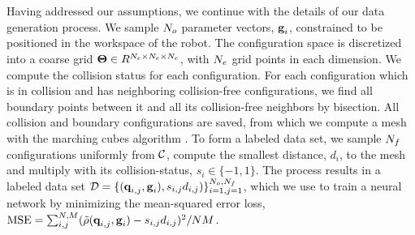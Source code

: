 \documentclass[../main.tex]{subfiles}
\begin{document}
\\\\
Having addressed our assumptions, we continue with the details of our data generation process. We sample $N_{o}$ parameter vectors, $\textbf{g}_i$, constrained to be positioned in the workspace of the robot. The configuration space is discretized into a coarse grid $\bm{\Theta} \in R^{N_{e} \times N_{e} \times N_{e}}$, with $N_{e}$ grid points in each dimension. We compute the collision status for each configuration. For each configuration which is in collision and has neighboring collision-free configurations, we find all boundary points between it and all its collision-free neighbors by bisection. All collision and boundary configurations are saved, from which we compute a mesh with the marching cubes algorithm \citep{marchingcubes}. To form a labeled data set, we sample $N_{f}$ configurations uniformly from $\mathcal{C}$, compute the smallest distance, $d_i$, to the mesh and multiply with its collision-status, $s_i \in \{-1, 1 \}$. The process results in a labeled data set $\mathcal{D}=\{(\textbf{q}_{i,j}, \textbf{g}_i), s_{i,j} d_{i,j})\}_{i=1, j=1}^{N_{o}, N_{f}}$, which we use to train a neural network by minimizing the mean-squared error loss, $\text{MSE} = \sum_{i,j}^{N, M}(\tilde{\rho}(\textbf{q}_{i, j}, \textbf{g}_{i})-  s_{i,j} d_{i,j})^2 / N M$.
\end{document}
